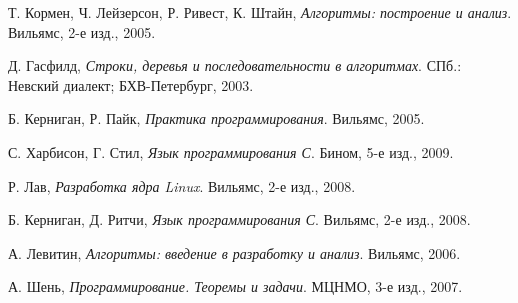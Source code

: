\begin{thebibliography}{9}

  Т. Кормен, Ч. Лейзерсон, Р. Ривест, К. Штайн,
  \emph{Алгоритмы: построение и анализ}.
  Вильямс,
  2-е изд.,
  2005.

  Д. Гасфилд,
  \emph{Строки, деревья и последовательности в алгоритмах}.
  СПб.: Невский диалект; БХВ-Петербург,
  2003.

  Б. Керниган, Р. Пайк,
  \emph{Практика программирования}.
  Вильямс,
  2005.

  С. Харбисон, Г. Стил,
  \emph{Язык программирования С}.
  Бином,
  5-е изд.,
  2009.

  Р. Лав,
  \emph{Разработка ядра Linux}.
  Вильямс,
  2-е изд.,
  2008.

  Б. Керниган, Д. Ритчи,
  \emph{Язык программирования С}.
  Вильямс,
  2-е изд.,
  2008.

  А. Левитин,
  \emph{Алгоритмы: введение в разработку и анализ}.
  Вильямс,
  2006.

  А. Шень,
  \emph{Программирование. Теоремы и задачи}.
  МЦНМО,
  3-е изд.,
  2007.

\end{thebibliography}
